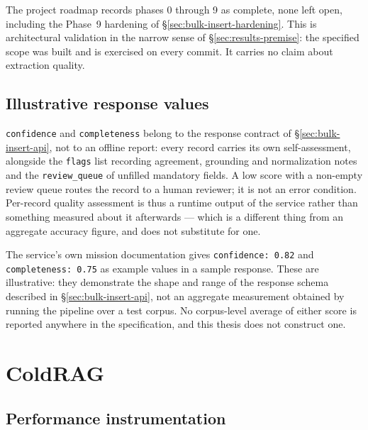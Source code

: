The project roadmap records phases 0 through 9 as complete, none left open, including the Phase~9 hardening of \S\ref{sec:bulk-insert-hardening}. This is architectural validation in the narrow sense of \S\ref{sec:results-premise}: the specified scope was built and is exercised on every commit. It carries no claim about extraction quality.

\subsection{Illustrative response values}
\label{sec:results-bulk-insert-illustrative}

\texttt{confidence} and \texttt{completeness} belong to the response contract of \S\ref{sec:bulk-insert-api}, not to an offline report: every record carries its own self-assessment, alongside the \texttt{flags} list recording agreement, grounding and normalization notes and the \texttt{review\_queue} of unfilled mandatory fields. A low score with a non-empty review queue routes the record to a human reviewer; it is not an error condition. Per-record quality assessment is thus a runtime output of the service rather than something measured about it afterwards — which is a different thing from an aggregate accuracy figure, and does not substitute for one.

The service's own mission documentation gives \texttt{confidence: 0.82} and \texttt{completeness: 0.75} as example values in a sample response. These are illustrative: they demonstrate the shape and range of the response schema described in \S\ref{sec:bulk-insert-api}, not an aggregate measurement obtained by running the pipeline over a test corpus. No corpus-level average of either score is reported anywhere in the specification, and this thesis does not construct one.

\section{ColdRAG}
\label{sec:results-coldrag}

\subsection{Performance instrumentation}
\label{sec:results-coldrag-tracker}

